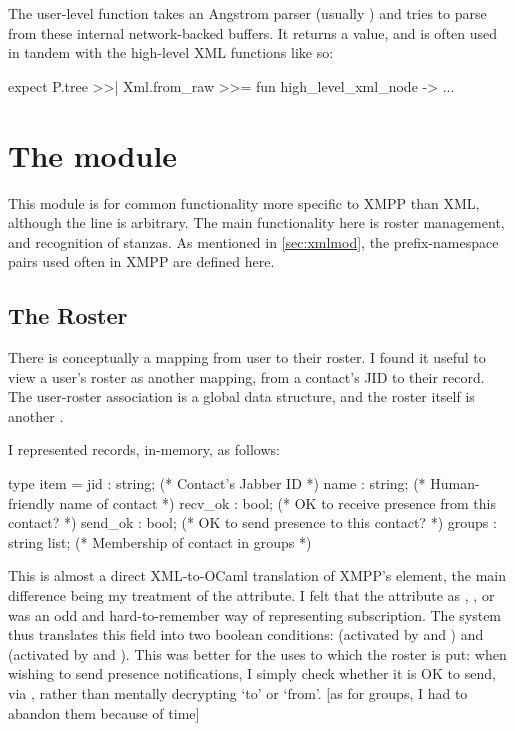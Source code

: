 The user-level  function takes an Angstrom parser (usually ) and tries to parse from these internal network-backed buffers. It returns a  value, and is often used in tandem with the high-level XML functions like so:

\begin{ocaml}
expect P.tree >>| Xml.from_raw >>= fun high_level_xml_node -> ...
\end{ocaml}

\section{The  module}
This module is for common functionality more specific to XMPP than XML, although the line is arbitrary. The main functionality here is roster management, and recognition of stanzas. As mentioned in \ref{sec:xmlmod}, the prefix-namespace pairs used often in XMPP are defined here.

\subsection{The Roster}
There is conceptually a mapping from user to their roster. I found it useful to view a user's roster as another mapping, from a contact's JID to their  record. The user-roster association is a global  data structure, and the roster itself is another .

I represented  records, in-memory, as follows:

\begin{minipage}{\linewidth}
  \begin{ocaml}
    type item = {
      jid     : string;        (* Contact's Jabber ID                       *)
      name    : string;        (* Human-friendly name of contact            *)
      recv_ok : bool;          (* OK to receive presence from this contact? *)
      send_ok : bool;          (* OK to send presence to this contact?      *)
      groups  : string list; (* Membership of contact in groups           *)
    }
  \end{ocaml}
\end{minipage}

This is almost a direct XML-to-OCaml translation of XMPP's  element, the main difference being my treatment of the  attribute. I felt that the  attribute as , ,  or  was an odd and hard-to-remember way of representing subscription. The system thus translates this field into two boolean conditions:  (activated by  and ) and  (activated by  and ). This was better for the uses to which the roster is put: when wishing to send presence notifications, I simply check whether it is OK to send, via , rather than mentally decrypting `to' or `from'. [as for groups, I had to abandon them because of time]

